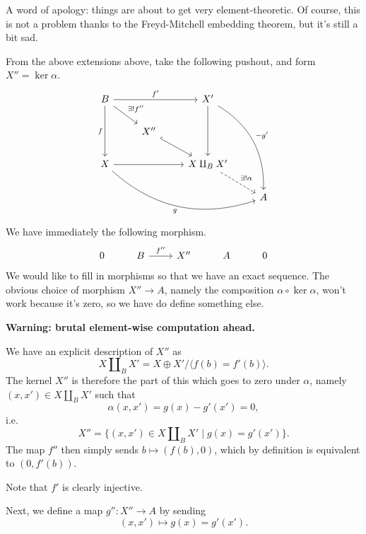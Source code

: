 \documentclass[main.tex]{subfiles}
\begin{document}
A word of apology: things are about to get very element-theoretic. Of course, this is not a problem thanks to the Freyd-Mitchell embedding theorem, but it's still a bit sad.

From the above extensions above, take the following pushout, and form $X'' = \ker \alpha$.
\begin{equation*}
  \begin{tikzcd}
    B
    \arrow[rr, "f'"]
    \arrow[dd, swap, "f"]
    \arrow[dr, "\exists!f''"]
    && X'
    \arrow[dd]
    \arrow[dddr, bend left, "-g'"]
    \\
    & X''
    \arrow[dr, hook]
    \\
    X
    \arrow[rr]
    \arrow[drrr, swap, bend right, "g"]
    && X \amalg_{B} X'
    \arrow[dr, dashed, "\exists!\alpha"]
    \\
    &&& A
  \end{tikzcd}
\end{equation*}
We have immediately the following morphism.
\begin{equation*}
  \begin{tikzcd}
    0
    & B
    \arrow[r, "f''"]
    & X''
    & A
    & 0
  \end{tikzcd}
\end{equation*}
We would like to fill in morphisms so that we have an exact sequence. The obvious choice of morphism $X'' \to A$, namely the composition $\alpha \circ \ker \alpha$, won't work because it's zero, so we have do define something else.

\textbf{Warning: brutal element-wise computation ahead.}

We have an explicit description of $X''$ as
\begin{equation*}
  X \amalg_{B} X' = X \oplus X' / \langle f(b) = f'(b) \rangle.
\end{equation*}
The kernel $X''$ is therefore the part of this which goes to zero under $\alpha$, namely $(x, x') \in X \amalg_{B} X'$ such that
\begin{equation*}
  \alpha(x, x') = g(x) - g'(x') = 0,
\end{equation*}
i.e.
\begin{equation*}
  X'' = \{(x, x') \in X \amalg_{B} X' \mid g(x) = g'(x')\}.
\end{equation*}
The map $f''$ then simply sends $b \mapsto (f(b), 0)$, which by definition is equivalent to $(0, f'(b))$.

Note that $f'$ is clearly injective.

Next, we define a map $g''\colon X'' \to A$ by sending
\begin{equation*}
  (x, x') \mapsto g(x) = g'(x').
\end{equation*}
\end{document}
